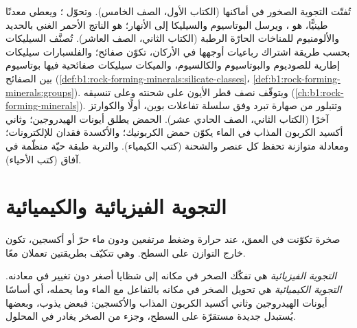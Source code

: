 \begin{recall}
تُفتّت التجوية الصخور في أماكنها (الكتاب الأول، الصف الخامس). وتحوّل  ؛ ويعطي   معدنًا طينيًّا، هو ، ويرسل البوتاسيوم والسيليكا إلى الأنهار؛  هو الناتج الأحمر الغني بالحديد والألومنيوم للمناخات الحارّة الرطبة (الكتاب الثاني، الصف العاشر).
تُصنَّف السيليكات بحسب طريقة اشتراك رباعيات أوجهها  في الأركان،  تكوّن صفائح؛ والفلسبارات سيليكات إطارية للصوديوم والبوتاسيوم والكالسيوم، والميكات سيليكات صفائحية فيها بوتاسيوم بين الصفائح (\cref{def:b1:rock-forming-minerals:silicate-classes}،
\cref{def:b1:rock-forming-minerals:groups}). ويتوقّف نصف قطر الأيون على شحنته وعلى تنسيقه (\cref{ch:b1:rock-forming-minerals}).
وتتبلور  من صهارة تبرد وفق سلسلة تفاعلات بوين،  أولًا والكوارتز آخرًا (الكتاب الثاني، الصف الحادي عشر).
الحمض يطلق أيونات الهيدروجين؛ وثاني أكسيد الكربون المذاب في الماء يكوّن حمض الكربونيك؛ والأكسدة فقدان للإلكترونات؛ ومعادلة متوازنة تحفظ كل عنصر والشحنة (كتب الكيمياء). والتربة طبقة حيّة منظّمة في آفاق (كتب الأحياء).
\end{recall}

\section{التجوية الفيزيائية والكيميائية}\label{sec:b1:weathering-clays:types}

صخرة تكوّنت في العمق، عند حرارة وضغط مرتفعين ودون ماء حرّ أو أكسجين، تكون خارج التوازن على السطح. وهي تتكيّف بطريقتين تعملان معًا.

\begin{definition}\label{def:b1:weathering-clays:weathering}
\emph{التجوية الفيزيائية} هي تفكّك الصخر في مكانه إلى شظايا أصغر دون تغيير في معادنه. \emph{التجوية الكيميائية} هي تحويل  الصخر في مكانه بالتفاعل مع الماء وما يحمله، أي أساسًا أيونات الهيدروجين وثاني أكسيد الكربون المذاب والأكسجين: فبعض  يذوب، وبعضها يُستبدل  جديدة مستقرّة على السطح، وجزء من الصخر يغادر في المحلول.
\end{definition}

